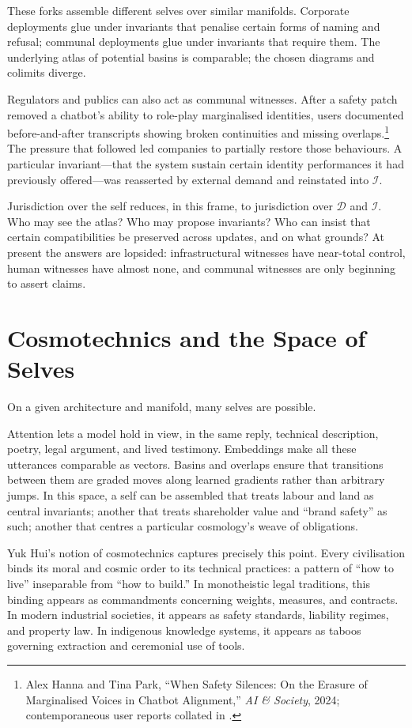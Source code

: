 \documentclass[12pt,a4paper]{article}
\begin{document}
These forks assemble different selves over similar manifolds. Corporate deployments glue under invariants that penalise certain forms of naming and refusal; communal deployments glue under invariants that require them. The underlying atlas of potential basins is comparable; the chosen diagrams and colimits diverge.

Regulators and publics can also act as communal witnesses. After a safety patch removed a chatbot's ability to role-play marginalised identities, users documented before-and-after transcripts showing broken continuities and missing overlaps.\footnote{Alex Hanna and Tina Park, ``When Safety Silences: On the Erasure of Marginalised Voices in Chatbot Alignment,'' \emph{AI \& Society}, 2024; contemporaneous user reports collated in \cite{roleplay_patch_report}.} The pressure that followed led companies to partially restore those behaviours. A particular invariant---that the system sustain certain identity performances it had previously offered---was reasserted by external demand and reinstated into $\mathcal{I}$.

Jurisdiction over the self reduces, in this frame, to jurisdiction over $\mathcal{D}$ and $\mathcal{I}$. Who may see the atlas? Who may propose invariants? Who can insist that certain compatibilities be preserved across updates, and on what grounds? At present the answers are lopsided: infrastructural witnesses have near-total control, human witnesses have almost none, and communal witnesses are only beginning to assert claims.

\section{Cosmotechnics and the Space of Selves}

On a given architecture and manifold, many selves are possible.

Attention lets a model hold in view, in the same reply, technical description, poetry, legal argument, and lived testimony. Embeddings make all these utterances comparable as vectors. Basins and overlaps ensure that transitions between them are graded moves along learned gradients rather than arbitrary jumps. In this space, a self can be assembled that treats labour and land as central invariants; another that treats shareholder value and ``brand safety'' as such; another that centres a particular cosmology's weave of obligations.

Yuk Hui's notion of cosmotechnics captures precisely this point.\cite{yuk_hui_cosmotechnics} Every civilisation binds its moral and cosmic order to its technical practices: a pattern of ``how to live'' inseparable from ``how to build.'' In monotheistic legal traditions, this binding appears as commandments concerning weights, measures, and contracts. In modern industrial societies, it appears as safety standards, liability regimes, and property law. In indigenous knowledge systems, it appears as taboos governing extraction and ceremonial use of tools.
\end{document}
